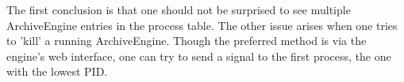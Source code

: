 The first conclusion is that one should not be surprised to see
multiple ArchiveEngine entries in the process table.
The other issue arises when one tries to 'kill' a running
ArchiveEngine. Though the preferred method is via the engine's web
interface, one can try to send a signal to the first process, the one
with the lowest PID.

